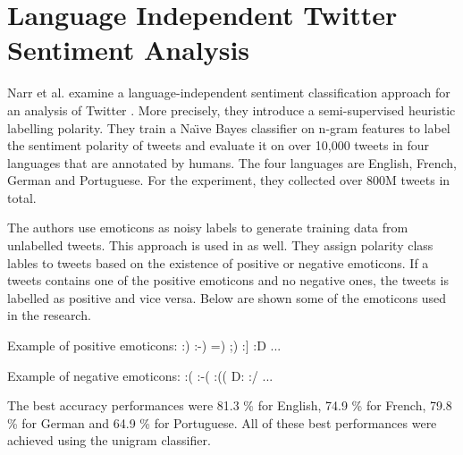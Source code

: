
\section{Language Independent Twitter Sentiment Analysis}
Narr et al. examine a language-independent sentiment classification approach for an analysis of Twitter \cite{dataset}.
More precisely, they introduce a semi-supervised heuristic labelling polarity.
They train a Na\"\i ve Bayes classifier on n-gram features to label the sentiment polarity of tweets and evaluate it on over 10,000 tweets in four languages that are annotated by humans.
The four languages are English, French, German and Portuguese.
For the experiment, they collected over 800M tweets in total.

The authors use emoticons as noisy labels to generate training data from unlabelled tweets.
This approach is used in \cite{pak} as well.
They assign polarity class lables to tweets based on the existence of positive or negative emoticons.
If a tweets contains one of the positive emoticons and no negative ones, the tweets is labelled as positive and vice versa.
Below are shown some of the emoticons used in the research.

Example of positive emoticons:
:) :-) =) ;) :] :D ...

Example of negative emoticons:
:( :-( :(( D: :/ ...

The best accuracy performances were 81.3 \% for English, 74.9 \% for French, 79.8 \% for German and 64.9 \% for Portuguese.
All of these best performances were achieved using the unigram classifier.

